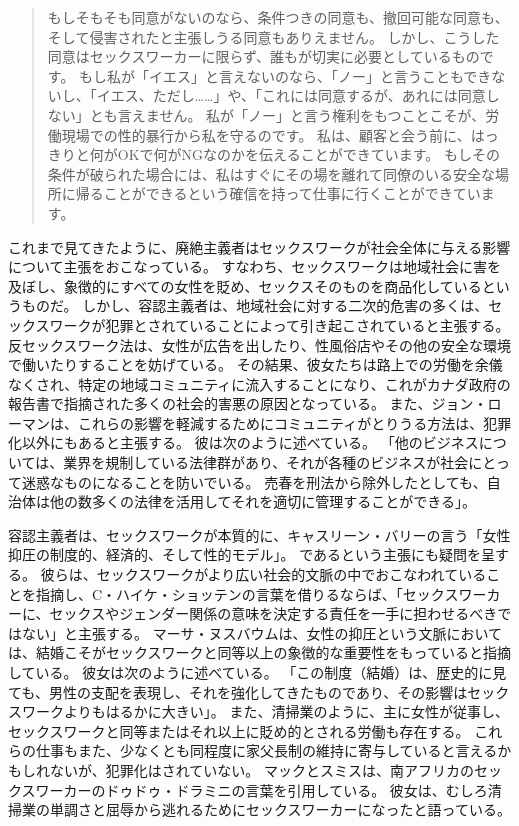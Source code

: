 \documentclass[paper=a4,book,openany]{jlreq} \usepackage{mystyle}
\begin{document}
\begin{quote}
もしそもそも同意がないのなら、条件つきの同意も、撤回可能な同意も、そして侵害されたと主張しうる同意もありえません。
しかし、こうした同意はセックスワーカーに限らず、誰もが切実に必要としているものです。
もし私が「イエス」と言えないのなら、「ノー」と言うこともできないし、「イエス、ただし……」や、「これには同意するが、あれには同意しない」とも言えません。
私が「ノー」と言う権利をもつことこそが、労働現場での性的暴行から私を守るのです。
私は、顧客と会う前に、はっきりと何がOKで何がNGなのかを伝えることができています。
もしその条件が破られた場合には、私はすぐにその場を離れて同僚のいる安全な場所に帰ることができるという確信を持って仕事に行くことができています。
\citep{slyfox17:_sex_worker_consen}
\end{quote}

これまで見てきたように、廃絶主義者はセックスワークが社会全体に与える影響について主張をおこなっている。
すなわち、セックスワークは地域社会に害を及ぼし、象徴的にすべての女性を貶め、セックスそのものを商品化しているというものだ。
しかし、容認主義者は、地域社会に対する二次的危害の多くは、セックスワークが犯罪とされていることによって引き起こされていると主張する。
反セックスワーク法は、女性が広告を出したり、性風俗店やその他の安全な環境で働いたりすることを妨げている。
その結果、彼女たちは路上での労働を余儀なくされ、特定の地域コミュニティに流入することになり、これがカナダ政府の報告書で指摘された多くの社会的害悪の原因となっている。
また、ジョン・ローマンは、これらの影響を軽減するためにコミュニティがとりうる方法は、犯罪化以外にもあると主張する。
彼は次のように述べている。
「他のビジネスについては、業界を規制している法律群があり、それが各種のビジネスが社会にとって迷惑なものになることを防いでいる。
売春を刑法から除外したとしても、自治体は他の数多くの法律を活用してそれを適切に管理することができる」\citep{makin09:_pickt_factor}。

容認主義者は、セックスワークが本質的に、キャスリーン・バリーの言う「女性抑圧の制度的、経済的、そして性的モデル」\citep[p.24]{barry95:_prost_sexual}。
であるという主張にも疑問を呈する。
彼らは、セックスワークがより広い社会的文脈の中でおこなわれていることを指摘し、C・ハイケ・ショッテンの言葉を借りるならば、「セックスワーカーに、セックスやジェンダー関係の意味を決定する責任を一手に担わせるべきではない」と主張する\citep[p.223]{schotten05:_men_mascul_male_domin}。
マーサ・ヌスバウムは、女性の抑圧という文脈においては、結婚こそがセックスワークと同等以上の象徴的な重要性をもっていると指摘している。
彼女は次のように述べている。
「この制度（結婚）は、歴史的に見ても、男性の支配を表現し、それを強化してきたものであり、その影響はセックスワークよりもはるかに大きい」\citep[p.719]{nussbaum98:_wheth_reason_prejud}。
また、清掃業のように、主に女性が従事し、セックスワークと同等またはそれ以上に貶め的とされる労働も存在する。
これらの仕事もまた、少なくとも同程度に家父長制の維持に寄与していると言えるかもしれないが、犯罪化はされていない。
マックとスミスは、南アフリカのセックスワーカーのドゥドゥ・ドラミニの言葉を引用している。
彼女は、むしろ清掃業の単調さと屈辱から逃れるためにセックスワーカーになったと語っている。
\end{document}
